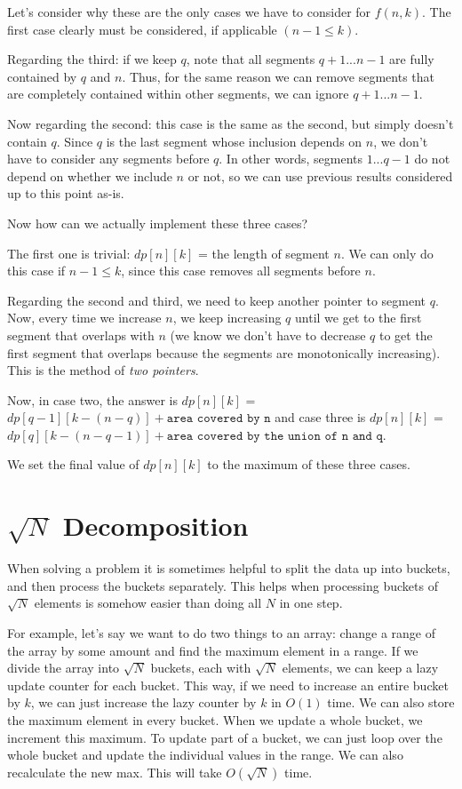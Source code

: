 \documentclass[11pt]{article}
\begin{document}
    Let's consider why these are the only cases we have to consider for $f(n, k)$. The first case clearly must be considered, if applicable $(n-1 \leq k)$.
    
    Regarding the third: if we keep $q$, note that all segments $q+1 ... n-1$ are fully contained by $q$ and $n$. Thus, for the same reason we can remove segments that are completely contained within other segments, we can ignore $q+1 ... n-1$.
    
    Now regarding the second: this case is the same as the second, but simply doesn't contain $q$. Since $q$ is the last segment whose inclusion depends on $n$, we don't have to consider any segments before $q$. In other words, segments $1...q-1$ do not depend on whether we include $n$ or not, so we can use previous results considered up to this point as-is.
    
    Now how can we actually implement these three cases?
    
    The first one is trivial: $dp[n][k]$ = the length of segment $n$. We can only do this case if $n-1 \leq k$, since this case removes all segments before $n$.
    
    Regarding the second and third, we need to keep another pointer to segment $q$. Now, every time we increase $n$, we keep increasing $q$ until we get to the first segment that overlaps with $n$ (we know we don't have to decrease $q$ to get the first segment that overlaps because the segments are monotonically increasing). This is the method of \textit{two pointers}.
    
    Now, in case two, the answer is $dp[n][k]$ = $dp[q-1][k-(n-q)] + \texttt{area covered by n}$ and case three is $dp[n][k]$ = $dp[q][k-(n-q-1)] + \texttt{area covered by the union of n and q}$. 
    
    We set the final value of $dp[n][k]$ to the maximum of these three cases.
    


\section{$\sqrt{N}$ Decomposition}

When solving a problem it is sometimes helpful to split the data up into buckets, and then process the buckets separately.  This helps when processing buckets of $\sqrt{N}$ elements is somehow easier than doing all $N$ in one step.

For example, let's say we want to do two things to an array: change a range of the array by some amount and find the maximum element in a range.  If we divide the array into $\sqrt{N}$ buckets, each with $\sqrt{N}$ elements, we can keep a lazy update counter for each bucket.  This way, if we need to increase an entire bucket by $k$, we can just increase the lazy counter by $k$ in $O(1)$ time.  We can also store the maximum element in every bucket.  When we update a whole bucket, we increment this maximum.  To update part of a bucket, we can just loop over the whole bucket and update the individual values in the range.  We can also recalculate the new max.  This will take $O(\sqrt{N})$ time.
\end{document}
